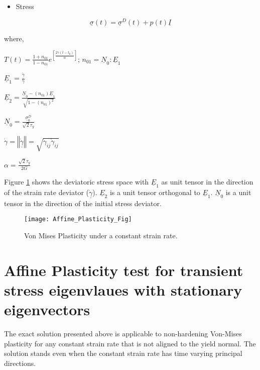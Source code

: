 \documentclass[10pt,letterpaper]{article}
\begin{document}
\begin{itemize}
\item Stress
\end{itemize}
\[
\underline{\sigma}\left(t\right)=\underline{\sigma}^{D}\left(t\right)+p\left(t\right)\underline{I}
\]


where,

$T\left(t\right)=\frac{1+n_{01}}{1-n_{01}}e^{\left[\frac{2\dot{\gamma}\left(t-t_{0}\right)}{\alpha}\right]}$;
$n_{01}=\underline{N}_{0}:\underline{E}_{1}$

$\underline{E}_{1}=\frac{\dot{\underline{\gamma}}}{\dot{\gamma}}$

$\underline{E}_{2}=\frac{\underline{N}_{0}-\left(n_{01}\right)\underline{E}_{1}}{\sqrt{1-\left(n_{01}\right)^{2}}}$

$\underline{N}_{0}=\frac{\underline{\sigma}_{0}^{D}}{\sqrt{2}\tau_{y}}$

$\dot{\gamma}=\left\Vert \dot{\underline{\gamma}}\right\Vert =\sqrt{\dot{\gamma}_{ij}\dot{\gamma}_{ij}}$

$\alpha=\frac{\sqrt{2}\tau_{y}}{2G}$

Figure \ref{fig:vm_plast} \cite{brannon2010multi} shows the deviatoric stress space with $\underline{E}_{1}$ as unit tensor in the direction of the strain rate deviator ($\dot{\underline{\gamma}}$). $\underline{E}_{2}$ is a unit tensor orthogonal to $\underline{E}_{1}$. $\underline{N}_{0}$ is a unit tensor in the direction of the initial stress deviator.

\begin{figure}[h]
\noindent \begin{centering}
\texttt{[image: Affine\_Plasticity\_Fig]}
\par\end{centering}

\caption{Von Mises Plasticity under a constant strain rate. \label{fig:vm_plast}}
\end{figure}

\section{Affine Plasticity test for transient stress eigenvlaues with stationary
eigenvectors}

The exact solution presented above is applicable to non-hardening
Von-Mises plasticity for any constant strain rate that is not aligned
to the yield normal. The solution stands even when the constant strain
rate has time varying principal directions.
\end{document}
